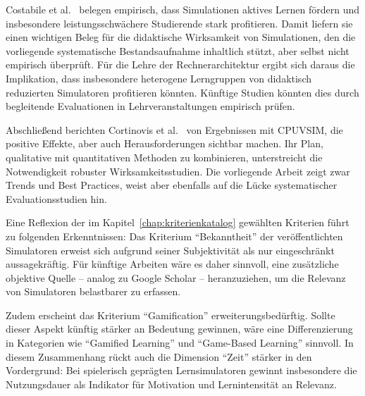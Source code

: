 Costabile et al.~\cite{costabile_using_2025} belegen empirisch, dass Simulationen aktives Lernen fördern und insbesondere leistungsschwächere Studierende stark profitieren. Damit liefern sie einen wichtigen Beleg für die didaktische Wirksamkeit von Simulationen, den die vorliegende systematische Bestandsaufnahme inhaltlich stützt, aber selbst nicht empirisch überprüft. Für die Lehre der Rechnerarchitektur ergibt sich daraus die Implikation, dass insbesondere heterogene Lerngruppen von didaktisch reduzierten Simulatoren profitieren könnten. Künftige Studien könnten dies durch begleitende Evaluationen in Lehrveranstaltungen empirisch prüfen.

Abschließend berichten Cortinovis et al.~\cite{cortinovis_further_2024} von Ergebnissen mit CPUVSIM, die positive Effekte, aber auch Herausforderungen sichtbar machen. Ihr Plan, qualitative mit quantitativen Methoden zu kombinieren, unterstreicht die Notwendigkeit robuster Wirksamkeitsstudien. Die vorliegende Arbeit zeigt zwar Trends und Best Practices, weist aber ebenfalls auf die Lücke systematischer Evaluationsstudien hin.

Eine Reflexion der im Kapitel~\ref{chap:kriterienkatalog} gewählten Kriterien führt zu folgenden Erkenntnissen: Das Kriterium \enquote{Bekanntheit} der veröffentlichten Simulatoren erweist sich aufgrund seiner Subjektivität als nur eingeschränkt aussagekräftig. Für künftige Arbeiten wäre es daher sinnvoll, eine zusätzliche objektive Quelle – analog zu Google Scholar – heranzuziehen, um die Relevanz von Simulatoren belastbarer zu erfassen. 

Zudem erscheint das Kriterium \enquote{Gamification} erweiterungsbedürftig. Sollte dieser Aspekt künftig stärker an Bedeutung gewinnen, wäre eine Differenzierung in Kategorien wie \enquote{Gamified Learning} und \enquote{Game-Based Learning} sinnvoll. In diesem Zusammenhang rückt auch die Dimension \enquote{Zeit} stärker in den Vordergrund: Bei spielerisch geprägten Lernsimulatoren gewinnt insbesondere die Nutzungsdauer als Indikator für Motivation und Lernintensität an Relevanz.

